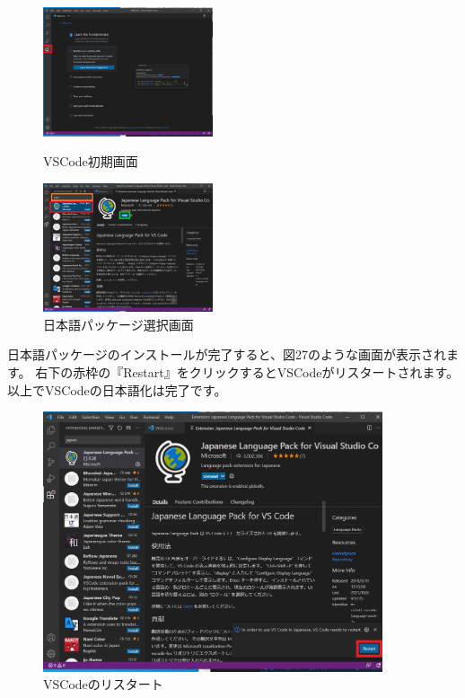 \documentclass[dvipdfmx]{jsarticle}
\begin{document}
\begin{figure}[H]
    \begin{minipage}[b]{0.45\linewidth}
        \centering
        \includegraphics[width=5cm]{images/VSCodeExtension1.png}
        \caption{VSCode初期画面}
    \end{minipage}
    \begin{minipage}[b]{0.45\linewidth}
        \centering
        \includegraphics[width=5cm]{images/VSCodeExtension2.png}
        \caption{日本語パッケージ選択画面}
    \end{minipage}
\end{figure}

日本語パッケージのインストールが完了すると、図27のような画面が表示されます。
右下の赤枠の『Restart』をクリックするとVSCodeがリスタートされます。
以上でVSCodeの日本語化は完了です。

\begin{figure}[H]
    \centering
    \includegraphics[width=10cm]{images/VSCodeExtension3.png}
    \caption{VSCodeのリスタート}
\end{figure}
\end{document}
